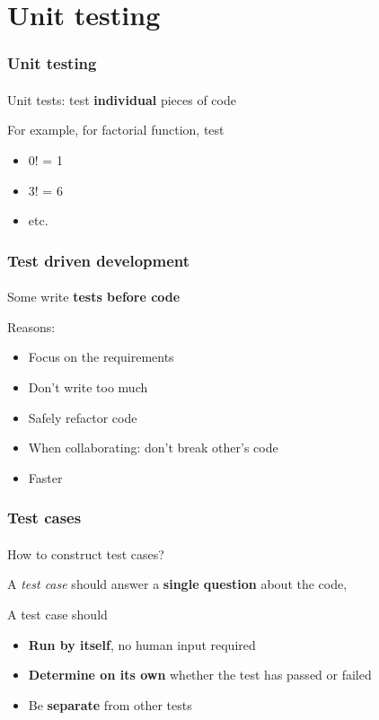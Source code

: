 \section{Unit testing} %
\label{sec:unit_testing}

\begin{frame}\frametitle{Unit testing}
    \framesubtitle{}

    Unit tests: test \textbf{individual} pieces of code

    For example, for factorial function, test
    \begin{itemize}
        \item 0! = 1
        \item 3! = 6
        \item etc.
    \end{itemize}

\end{frame}

\begin{frame}\frametitle{Test driven development}
    \framesubtitle{}

    Some write \textbf{tests before code}

    Reasons:
    \begin{itemize}
        \item Focus on the requirements
        \item Don't write too much
        \item Safely refactor code
        \item When collaborating: don't break other's code
        \item Faster
    \end{itemize}

\end{frame}

\begin{frame}\frametitle{Test cases}
    \framesubtitle{}

    How to construct test cases?

    A \emph{test case} should answer a \textbf{single question} about the code,

    A test case should
    \begin{itemize}
        \item \textbf{Run by itself}, no human input required
        \item \textbf{Determine on its own} whether the test has passed or failed
        \item Be \textbf{separate} from other tests
    \end{itemize}

\end{frame}

